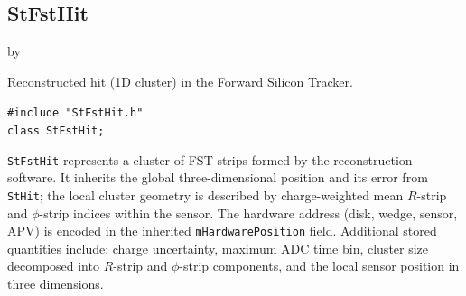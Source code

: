\documentclass[twoside]{article}
\newcommand{\entrylabel}[1]{\mbox{\textbf{{#1}}}\hfil}%
\newenvironment{entry}
{\begin{list}{}%
    {\renewcommand{\makelabel}{\entrylabel}%
     \setlength{\labelwidth}{90pt}%
     \setlength{\leftmargin}{\labelwidth}
     \advance\leftmargin by \labelsep%
      }%
    }%
  {\end{list}}
\newcommand{\Entrylabel}[1]%
{\raisebox{0pt}[1ex][0pt]{\makebox[\labelwidth][l]%
    {\parbox[t]{\labelwidth}{\hspace{0pt}\textbf{{#1}}}}}}
\newenvironment{Entry}%
{\renewcommand{\entrylabel}{\Entrylabel}\begin{entry}}%
  {\end{entry}}
\begin{document}
\subsection{StFstHit}
\label{sec:StFstHit}
\begin{Entry}
\item[Summary] Reconstructed hit (1D cluster) in the Forward Silicon Tracker.
\item[Synopsis]
    \verb+#include "StFstHit.h"+\\
    \verb+class StFstHit;+\\
\item[Description]
  \texttt{StFstHit} represents a cluster of FST strips formed by the reconstruction
  software.  It inherits the global three-dimensional position and its error from
  \texttt{StHit}; the local cluster geometry is described by charge-weighted mean
  $R$-strip and $\phi$-strip indices within the sensor.  The hardware address (disk,
  wedge, sensor, APV) is encoded in the inherited \texttt{mHardwarePosition} field.
  Additional stored quantities include: charge uncertainty, maximum ADC time bin, cluster
  size decomposed into $R$-strip and $\phi$-strip components, and the local sensor
  position in three dimensions.


\end{Entry}
\end{document}
